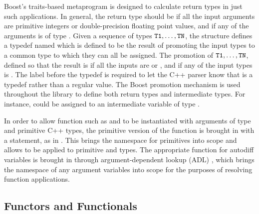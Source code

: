 \documentclass[10pt]{article}
\begin{document}
Boost's traits-based metaprogram 
\citep{Boost:2011} is designed to calculate return types in just such
applications.  In general, the return type should be  if
all the input arguments are primitive integers or double-precision
floating point values, and  if any of the arguments
is of type .  Given a sequence of types ${\tt T1},
\ldots, {\tt TN}$, the structure
 defines a typedef
named  which is defined to be the result of promoting the
input types to a common type to which they can all be assigned.  The
promotion of ${\tt T1}, \ldots, {\tt TN}$, defined so that the
result is  if all the inputs are  or
, and  if any of the input types is
.  The label  before the typedef is
required to let the C++ parser know that  is a typedef
rather than a regular value.  The Boost promotion mechanism is used
throughout the  library to define both return types
and intermediate types.  For instance,  could be assigned
to an intermediate variable of type .

In order to allow function such as  and  to be
instantiated with arguments of type  and primitive
C++ types, the primitive version of the function is brought in with a
 statement, as in .  This brings the
namespace for primitives into scope and allows  to be
applied to primitive  and  types.  The
appropriate function for autodiff variables  is
brought in through argument-dependent lookup (ADL)
\cite[Section~3.4]{cpp-standard:2003}, which brings the namespace of
any argument variables into scope for the purposes of resolving
function applications.


\subsection{Functors and Functionals}
\end{document}
